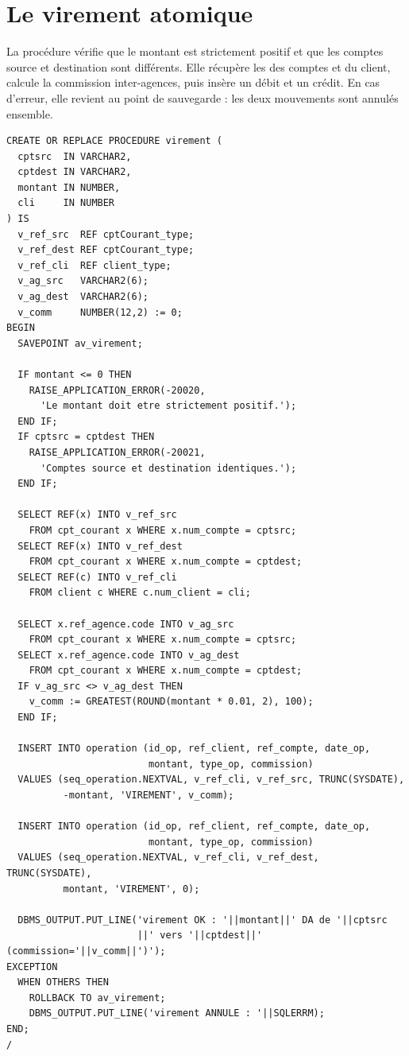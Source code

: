 \section{Le virement atomique}

La procédure  vérifie que le montant est strictement positif et
que les comptes source et destination sont différents. Elle récupère les
 des comptes et du client, calcule la commission inter-agences, puis
insère un débit et un crédit. En cas d'erreur, elle revient au point de
sauvegarde : les deux mouvements sont annulés ensemble.

\begin{lstlisting}[caption={Procédure \code{virement} : atomicité par \code{SAVEPOINT}.},label={lst:virement}]
CREATE OR REPLACE PROCEDURE virement (
  cptsrc  IN VARCHAR2,
  cptdest IN VARCHAR2,
  montant IN NUMBER,
  cli     IN NUMBER
) IS
  v_ref_src  REF cptCourant_type;
  v_ref_dest REF cptCourant_type;
  v_ref_cli  REF client_type;
  v_ag_src   VARCHAR2(6);
  v_ag_dest  VARCHAR2(6);
  v_comm     NUMBER(12,2) := 0;
BEGIN
  SAVEPOINT av_virement;

  IF montant <= 0 THEN
    RAISE_APPLICATION_ERROR(-20020,
      'Le montant doit etre strictement positif.');
  END IF;
  IF cptsrc = cptdest THEN
    RAISE_APPLICATION_ERROR(-20021,
      'Comptes source et destination identiques.');
  END IF;

  SELECT REF(x) INTO v_ref_src
    FROM cpt_courant x WHERE x.num_compte = cptsrc;
  SELECT REF(x) INTO v_ref_dest
    FROM cpt_courant x WHERE x.num_compte = cptdest;
  SELECT REF(c) INTO v_ref_cli
    FROM client c WHERE c.num_client = cli;

  SELECT x.ref_agence.code INTO v_ag_src
    FROM cpt_courant x WHERE x.num_compte = cptsrc;
  SELECT x.ref_agence.code INTO v_ag_dest
    FROM cpt_courant x WHERE x.num_compte = cptdest;
  IF v_ag_src <> v_ag_dest THEN
    v_comm := GREATEST(ROUND(montant * 0.01, 2), 100);
  END IF;

  INSERT INTO operation (id_op, ref_client, ref_compte, date_op,
                         montant, type_op, commission)
  VALUES (seq_operation.NEXTVAL, v_ref_cli, v_ref_src, TRUNC(SYSDATE),
          -montant, 'VIREMENT', v_comm);

  INSERT INTO operation (id_op, ref_client, ref_compte, date_op,
                         montant, type_op, commission)
  VALUES (seq_operation.NEXTVAL, v_ref_cli, v_ref_dest, TRUNC(SYSDATE),
          montant, 'VIREMENT', 0);

  DBMS_OUTPUT.PUT_LINE('virement OK : '||montant||' DA de '||cptsrc
                       ||' vers '||cptdest||' (commission='||v_comm||')');
EXCEPTION
  WHEN OTHERS THEN
    ROLLBACK TO av_virement;
    DBMS_OUTPUT.PUT_LINE('virement ANNULE : '||SQLERRM);
END;
/
\end{lstlisting}

